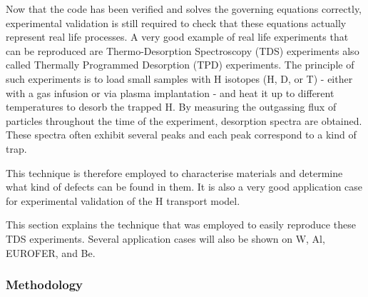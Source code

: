 Now that the code has been verified and solves the governing equations correctly, experimental validation is still required to check that these equations actually represent real life processes.
A very good example of real life experiments that can be reproduced are Thermo-Desorption Spectroscopy (TDS) experiments also called Thermally Programmed Desorption (TPD) experiments.
The principle of such experiments is to load small samples with H isotopes (H, D, or T) - either with a gas infusion or via plasma implantation - and heat it up to different temperatures to desorb the trapped H.
By measuring the outgassing flux of particles throughout the time of the experiment, desorption spectra are obtained.
These spectra often exhibit several peaks and each peak correspond to a kind of trap.

This technique is therefore employed to characterise materials and determine what kind of defects can be found in them. 
It is also a very good application case for experimental validation of the H transport model.

This section explains the technique that was employed to easily reproduce these TDS experiments.
Several application cases will also be shown on W, Al, EUROFER, and Be.

\subsubsection{Methodology} \label{methodology}


